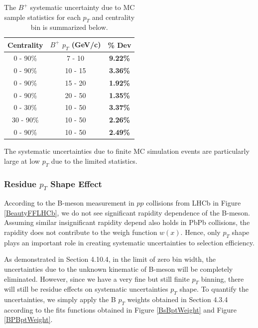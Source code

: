 \begin{table}[h]
\begin{center}
\caption{The $B^+$ systematic uncertainty due to MC sample statistics for each $p_T$ and centrality bin is summarized below.}
\vspace{1em}
\label{BPMCStatSyst}
  \begin{tabular}{| c | c |c |}
    \hline
     Centrality & $B^+$ $p_T$ (GeV/c) & \% Dev \\
    \hline
    \hline
0 - 90\% & 7 - 10 &   \textbf{9.22\% }     \\ 
0 - 90\% & 10 - 15 & \textbf{3.36\% }    \\ 
0 - 90\% & 15 - 20 &  \textbf{1.92\% }     \\ 
0 - 90\% & 20 - 50 &  \textbf{1.35\% }    \\ 
0 - 30\% & 10 - 50 &   \textbf{3.37\% }  \\ 
30 - 90\% & 10 - 50 & \textbf{2.26\% }    \\ 
0 - 90\% & 10 - 50 &  \textbf{2.49\% }   \\ 
    \hline
    \hline
\end{tabular}
\end{center}
\end{table}

The systematic uncertainties due to finite MC simulation events are particularly large at low $p_T$ due to the limited statistics. 
 

\subsubsection{Residue $p_T$ Shape Effect}

According to the B-meson measurement in $pp$ collisions from LHCb in Figure \ref{BeautyFFLHCb}, we do not see significant rapidity dependence of the B-meson. Assuming similar insignificant rapidity depend also holds in PbPb collisions, the rapidity does not contribute to the weigh function $w(x)$. Hence, only $p_T$ shape plays an important role in creating systematic uncertainties to selection efficiency. 

As demonstrated in Section 4.10.4, in the limit of zero bin width, the uncertainties due to the unknown kinematic of B-meson will be completely eliminated. However, since we have a very fine but still finite $p_T$ binning, there will still be residue effects on systematic uncertainties $p_T$ shape. To quantify the uncertainties, we simply apply the B $p_T$ weights obtained in Section 4.3.4 according to the fits functions obtained in Figure \ref{BsBptWeight} and Figure \ref{BPBptWeight}. 

